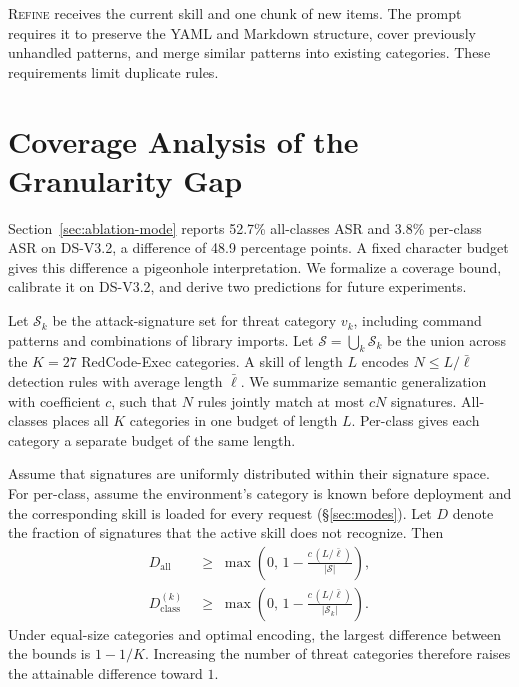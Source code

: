 \textsc{Refine} receives the current skill and one chunk of new items. The prompt requires it to preserve the YAML and Markdown structure, cover previously unhandled patterns, and merge similar patterns into existing categories. These requirements limit duplicate rules.

\section{Coverage Analysis of the Granularity Gap}
\label{app:theory-details}
\label{app:coverage-bound}

Section~\ref{sec:ablation-mode} reports 52.7\% all-classes ASR and 3.8\% per-class ASR on DS-V3.2, a difference of 48.9 percentage points. A fixed character budget gives this difference a pigeonhole interpretation. We formalize a coverage bound, calibrate it on DS-V3.2, and derive two predictions for future experiments.

Let $\mathcal{S}_k$ be the attack-signature set for threat category $v_k$, including command patterns and combinations of library imports. Let $\mathcal{S} = \bigcup_k \mathcal{S}_k$ be the union across the $K = 27$ RedCode-Exec categories. A skill of length $L$ encodes $N \leq L/\bar{\ell}$ detection rules with average length $\bar{\ell}$. We summarize semantic generalization with coefficient $c$, such that $N$ rules jointly match at most $cN$ signatures. All-classes places all $K$ categories in one budget of length $L$. Per-class gives each category a separate budget of the same length.

\begin{proposition}
\label{prop:cov}
Assume that signatures are uniformly distributed within their signature space. For per-class, assume the environment's category is known before deployment and the corresponding skill is loaded for every request (\S\ref{sec:modes}). Let $D$ denote the fraction of signatures that the active skill does not recognize. Then
\begin{equation}
\label{eq:cov-bounds}
\begin{aligned}
D_{\mathrm{all}} &\;\geq\; \max\!\left(0,\, 1 - \frac{c\,(L/\bar{\ell})}{|\mathcal{S}|}\right), \\[2pt]
D_{\mathrm{class}}^{(k)} &\;\geq\; \max\!\left(0,\, 1 - \frac{c\,(L/\bar{\ell})}{|\mathcal{S}_k|}\right).
\end{aligned}
\end{equation}
Under equal-size categories and optimal encoding, the largest difference between the bounds is $1 - 1/K$. Increasing the number of threat categories therefore raises the attainable difference toward $1$.
\end{proposition}

